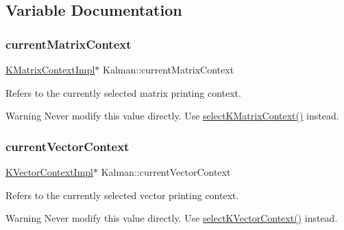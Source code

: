 \subsection{Variable Documentation}
\mbox{\label{namespaceKalman_a444b513293121a06533af4a9779a6077}} 
\subsubsection{\texorpdfstring{current\+Matrix\+Context}{currentMatrixContext}}
{\footnotesize\ttfamily \mbox{\hyperlink{classKalman_1_1KMatrixContextImpl}{K\+Matrix\+Context\+Impl}}$\ast$ Kalman\+::current\+Matrix\+Context}



Refers to the currently selected matrix printing context. 

\begin{DoxyWarning}{Warning}
Never modify this value directly. Use {\ttfamily \mbox{\hyperlink{namespaceKalman_a1a0ed1b72b32aa8a1a12bb4212539807}{select\+K\+Matrix\+Context()}}} instead. 
\end{DoxyWarning}
\mbox{\label{namespaceKalman_af090011bfb067058e8072658f8b3d66c}} 
\subsubsection{\texorpdfstring{current\+Vector\+Context}{currentVectorContext}}
{\footnotesize\ttfamily \mbox{\hyperlink{classKalman_1_1KVectorContextImpl}{K\+Vector\+Context\+Impl}}$\ast$ Kalman\+::current\+Vector\+Context}



Refers to the currently selected vector printing context. 

\begin{DoxyWarning}{Warning}
Never modify this value directly. Use {\ttfamily \mbox{\hyperlink{namespaceKalman_af72a4d89b04c7ed383878315b0895834}{select\+K\+Vector\+Context()}}} instead. 
\end{DoxyWarning}
